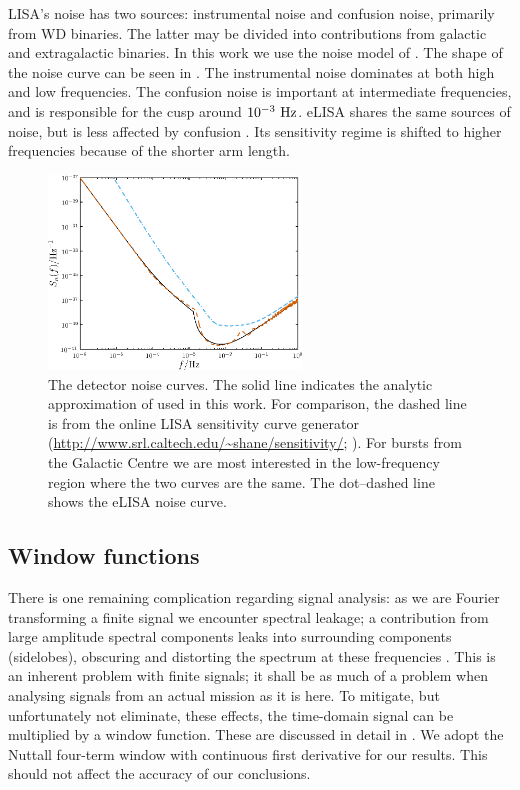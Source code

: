 LISA's noise has two sources: instrumental noise and confusion noise, primarily from WD binaries. The latter may be divided into contributions from galactic and extragalactic binaries. In this work we use the noise model of \citet{Barack2004}. The shape of the noise curve can be seen in . The instrumental noise dominates at both high and low frequencies. The confusion noise is important at intermediate frequencies, and is responsible for the cusp around $10^{-3}~\mathrm{Hz}$. eLISA shares the same sources of noise, but is less affected by confusion \citep{Jennrich2011}. Its sensitivity regime is shifted to higher frequencies because of the shorter arm length.
\begin{figure}[!htp]
\centering
\includegraphics[width=0.6\textwidth]{./images/Fig_Noise}
\caption{The detector noise curves. The solid line indicates the analytic approximation of \citet{Barack2004} used in this work. For comparison, the dashed line is from the online LISA sensitivity curve generator (\url{http://www.srl.caltech.edu/~shane/sensitivity/}; \citealt*{Larson2000, Larson2002}). For bursts from the Galactic Centre we are most interested in the low-frequency region where the two curves are the same. The dot--dashed line shows the eLISA noise curve.}
\label{fig:Noise}
\end{figure}

\subsection{Window functions}

There is one remaining complication regarding signal analysis: as we are Fourier transforming a finite signal we encounter spectral leakage; a contribution from large amplitude spectral components leaks into surrounding components (sidelobes), obscuring and distorting the spectrum at these frequencies \citep{Harris1978}. This is an inherent problem with finite signals; it shall be as much of a problem when analysing signals from an actual mission as it is here. To mitigate, but unfortunately not eliminate, these effects, the time-domain signal can be multiplied by a window function. These are discussed in detail in . We adopt the Nuttall four-term window with continuous first derivative \citep{Nuttall1981} for our results. This should not affect the accuracy of our conclusions.

